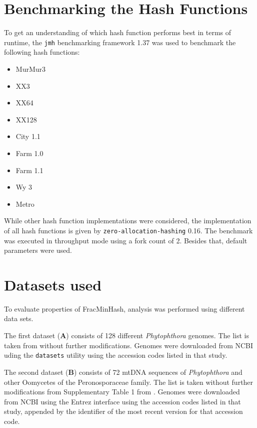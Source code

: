 \section{Benchmarking the Hash Functions}
To get an understanding of which hash function performs best in terms of
runtime, the \texttt{jmh} benchmarking framework 1.37 was used to benchmark the
following hash functions:

\begin{itemize}
  \item MurMur3 
  \item XX3
  \item XX64
  \item XX128
  \item City 1.1
  \item Farm 1.0
  \item Farm 1.1
  \item Wy 3
  \item Metro
\end{itemize}
 
While other hash function implementations were considered, the implementation of
all hash functions is given by \texttt{zero-allocation-hashing} 0.16. The
benchmark was executed in throughput mode using a fork count of 2. Besides that,
default parameters were used.


\section{Datasets used}
To evaluate properties of FracMinHash, analysis was performed using different
data sets. 

The first dataset (\textbf{A}) consists of 128 different \textit{Phytophthora}
genomes. The list is taken from \cite{mandalComparativeGenomeAnalysis2022}
without further modifications. Genomes were downloaded from NCBI uding the
\texttt{datasets} utility \cite{sayersDatabaseResourcesNational2022} using the
accession codes listed in that study.

The second dataset (\textbf{B}) consists of 72 mtDNA sequences of
\textit{Phytophthora}
and other Oomycetes of the Peronosporaceae family. The list is taken without
further modifications from Supplementary Table 1 from
\cite{winkworthComparativeAnalysesComplete2022}. Genomes were downloaded from
NCBI using the Entrez interface \cite{sayersDatabaseResourcesNational2022} using
the accession codes listed in that study, appended by the identifier of the most
recent version for that accession code.

